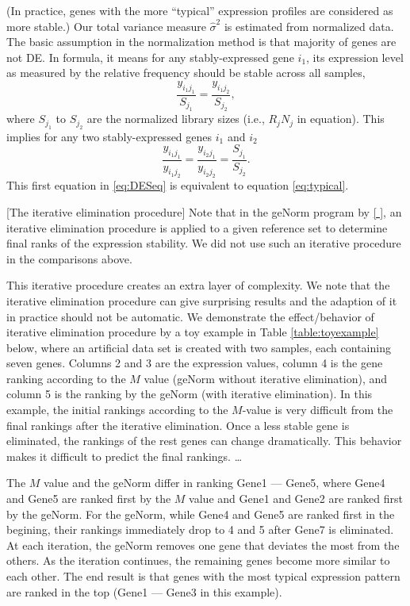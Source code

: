 \documentclass[11pt, a4paper]{article}
\begin{document}
(In practice, genes  with the more ``typical'' expression profiles are
considered as more stable.)
Our total variance measure $\hat\sigma^2$ is estimated from normalized data.
The basic assumption in the normalization method is that majority of genes are
not DE. In formula, it means for any stably-expressed gene $i_1$, its expression
level as measured by the relative frequency should be stable across all
samples,
\begin{equation}\label{eq:DESeq} 
    \frac{y_{i_1j_1}}{S_{j_1}}= \dfrac{y_{i_1j_2}}{S_{j_2}},
\end{equation}
where $S_{j_1}$ to $S_{j_2}$ are the normalized library sizes (i.e., $R_j N_j$ in equation).
This implies for any two stably-expressed genes $i_1$ and $i_2$
\begin{equation}\label{eq:DESeq2} 
    \frac{y_{i_1j_1}}{y_{i_1j_2}} = \frac{y_{i_2j_1}}{y_{i_2j_2}} =
    \frac{S_{j_1}}{S_{j_2}}.
\end{equation}
This first equation in \ref{eq:DESeq} is equivalent to equation
\ref{eq:typical}.

[The iterative elimination procedure]
Note that in the geNorm program by \ref{ }, an iterative elimination procedure
is applied to a given reference set to determine final ranks of the expression
stability. We did not use such an iterative procedure in the comparisons
above.  

This iterative procedure creates an extra layer of complexity.  We note that
the iterative elimination procedure can give surprising results and the
adaption of it in practice should not be automatic.  We demonstrate the
effect/behavior of iterative elimination procedure by a toy example in Table
\ref{table:toyexample} below, where an artificial data set is created with two
samples, each containing seven genes. Columns 2 and 3 are the expression
values, column 4 is the gene ranking according to the $M$ value (geNorm
without iterative elimination), and column 5 is the ranking by the geNorm
(with iterative elimination). In this example, the initial rankings according
to the $M$-value is very difficult from the final rankings after the iterative
elimination. Once a less stable gene is eliminated, the rankings of the rest
genes can change dramatically. This behavior makes it difficult to predict the
final rankings. \dots

  
The $M$ value and the geNorm differ in ranking Gene1 --- Gene5, where Gene4
and Gene5 are ranked first by the $M$ value and Gene1 and Gene2 are ranked
first by the geNorm. For the geNorm, while Gene4 and Gene5 are ranked first in
the begining, their rankings immediately drop to 4 and 5 after Gene7 is
eliminated. At each iteration, the geNorm removes one gene that deviates the
most from the others. As the iteration continues, the remaining genes become
more similar to each other. The end result is that genes with the most typical
expression pattern are ranked in the top (Gene1 --- Gene3 in this example). 	  
\end{document}
